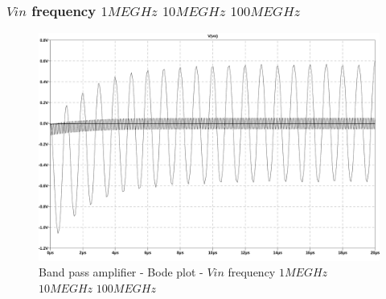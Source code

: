 \documentclass[10pt,a4paper]{article}
\begin{document}
\subsubsection{$Vin$ frequency $1MEGHz$ $10MEGHz$ $100MEGHz$}


\begin{figure}[H]
  \centering
  \includegraphics[width=14cm]{graph/2d4c.jpg}
  \caption{Band pass amplifier - Bode plot - $Vin$ frequency $1MEGHz$ $10MEGHz$ $100MEGHz$}
  \label{2d4cgraph}
\end{figure}
\end{document}
